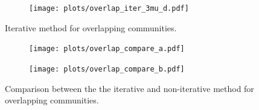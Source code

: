 \begin{figure}
\begin{subfigure}{0.5\textwidth}
    \end{subfigure}%
    \begin{subfigure}{0.5\textwidth}
    \texttt{[image: plots/overlap\_iter\_3mu\_d.pdf]}
    \end{subfigure}
    \caption{Iterative method for overlapping communities.}
\end{figure}

\begin{figure}
    \centering
    \begin{subfigure}{0.5\textwidth}
    \texttt{[image: plots/overlap\_compare\_a.pdf]}
    \end{subfigure}%
    \begin{subfigure}{0.5\textwidth}
    \texttt{[image: plots/overlap\_compare\_b.pdf]}
    \end{subfigure}
    \caption{Comparison between the the iterative and non-iterative method for overlapping communities.}
\end{figure}


